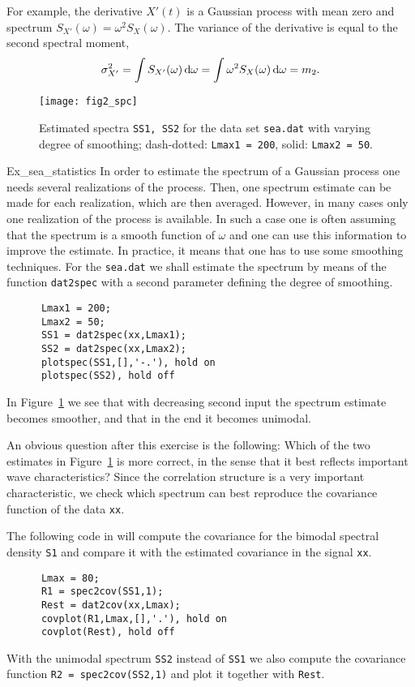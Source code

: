 For example, the derivative $X'(t)$ is a Gaussian process
with mean zero and spectrum $S_{X'}(\omega)=\omega^2S_X(\omega)$.
The variance of the derivative is equal to the second spectral moment,
$$
\sigma_{X'} ^2=\int S_{X'}(\omega)\, \mathrm{d}\omega =
\int \omega ^2 S_X(\omega)\, \mathrm{d}\omega = m_2.
$$

\begin{figure}[tbh]
\centering
\texttt{[image: fig2\_spc]}
\vspace{-3mm}
\caption[Spectra  of {\tt sea.dat} with varying degree of smoothing]{
Estimated spectra {\tt SS1, SS2} for the data set {\tt sea.dat}
with varying degree of smoothing; dash-dotted: {\tt Lmax1 = 200}, solid: {\tt Lmax2 = 50}.}
  \label{fig2_spc}
\end{figure}

\begin{cex}{Ex_sea_statistics}
In order to estimate the spectrum of a Gaussian process one needs
several realizations of the process. Then, one spectrum estimate can be
made for each realization, which are then averaged. However, in many cases
only one realization of the process is available. In such a case
one is often assuming that the spectrum is a smooth function of $\omega$
and one can use this information to improve the estimate. In practice,
it means that one has to use some smoothing techniques.
For the {\tt sea.dat} we shall estimate the spectrum
by means of the \progname{} function
{\tt dat2spec}
with a second parameter defining the degree of smoothing.\label{page:SS1}
{\small\begin{verbatim}
      Lmax1 = 200; 
      Lmax2 = 50;
      SS1 = dat2spec(xx,Lmax1);
      SS2 = dat2spec(xx,Lmax2);
      plotspec(SS1,[],'-.'), hold on
      plotspec(SS2), hold off
\end{verbatim}}
\noindent In Figure~\ref{fig2_spc}
we see that with decreasing second input the spectrum estimate becomes 
smoother, and that in the end it becomes unimodal.

An obvious question after this exercise is the following: Which of the two estimates in 
Figure~\ref{fig2_spc} is more correct, in the sense that it best reflects 
important wave characteristics? Since the correlation structure is a very 
important characteristic, we check which spectrum can best reproduce the 
covariance function of the data {\tt xx}. 

The following
code in \progname{} will compute the covariance for the bimodal spectral
density {\tt S1}
and compare it with the estimated covariance in the signal {\tt xx}.
{\small\begin{verbatim}
      Lmax = 80;
      R1 = spec2cov(SS1,1);
      Rest = dat2cov(xx,Lmax);
      covplot(R1,Lmax,[],'.'), hold on
      covplot(Rest), hold off
\end{verbatim}}
\noindent With the unimodal spectrum {\tt SS2} instead of {\tt SS1} we also compute the 
covariance function {\tt R2 = spec2cov(SS2,1)} and plot it together with {\tt Rest}.  


\end{cex}
